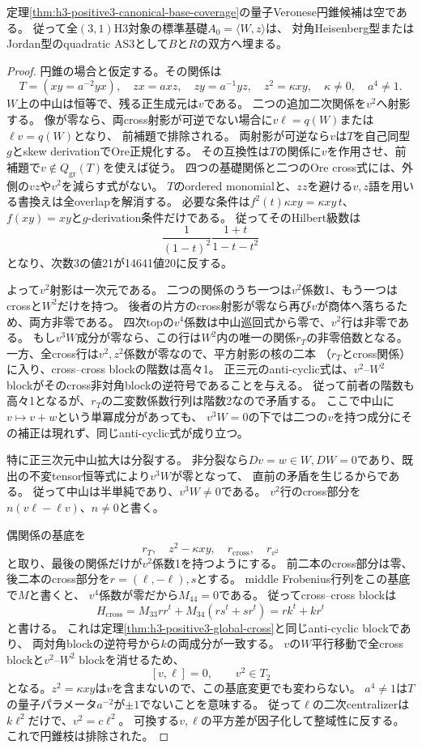 \begin{theorem}\label{thm:h3-positive3-cone-base-exclusion}
定理\ref{thm:h3-positive3-canonical-base-coverage}の量子Veronese円錐候補は空である。
従って全$(3,1)$H3対象の標準基礎$A_0=\langle W,z\rangle$は、
対角Heisenberg型またはJordan型のquadratic AS3として$B$と$R$の双方へ埋まる。
\end{theorem}
\begin{proof}
円錐の場合と仮定する。その関係は
\[
 T=(xy=a^{-2}yx),\quad zx=axz,\quad zy=a^{-1}yz,
 \quad z^2=\kappa xy,\quad\kappa\ne0,\quad a^4\ne1.
\]
$W$上の中山は恒等で、残る正生成元は$v$である。
二つの追加二次関係を$v^2$へ射影する。
像が零なら、両cross射影が可逆でない場合に$v\ell=q(W)$または$\ell v=q(W)$となり、
前補題で排除される。
両射影が可逆なら$v$は$T$を自己同型$g$とskew derivationでOre正規化する。
その互換性は$T$の関係に$v$を作用させ、前補題で$v\notin Q_{\mathrm{gr}}(T)$を使えば従う。
四つの基礎関係と二つのOre cross式には、外側の$vz$や$v^2$を減らす式がない。
$T$のordered monomialと、$zz$を避ける$v,z$語を用いる書換えは全overlapを解消する。
必要な条件は$f^2(t)\kappa xy=\kappa xy\,t$、$f(xy)=xy$と$g$-derivation条件だけである。
従ってそのHilbert級数は
\[
 \frac1{(1-t)^2}\frac{1+t}{1-t-t^2}
\]
となり、次数3の値21が14641値20に反する。

よって$v^2$射影は一次元である。
二つの関係のうち一つは$v^2$係数1、もう一つはcrossと$W^2$だけを持つ。
後者の片方のcross射影が零なら再び$v$が商体へ落ちるため、両方非零である。
四次topの$v^4$係数は中山巡回式から零で、$v^2$行は非零である。
もし$v^3W$成分が零なら、この行は$W^2$内の唯一の関係$r_T$の非零倍数となる。
一方、全cross行は$v^2,z^2$係数が零なので、平方射影の核の二本
（$r_T$とcross関係）に入り、cross--cross blockの階数は高々1。
正三元のanti-cyclic式は、$v^2$--$W^2$ blockがそのcross非対角blockの逆符号であることを与える。
従って前者の階数も高々1となるが、$r_T$の二変数係数行列は階数2なので矛盾する。
ここで中山に$v\mapsto v+w$という単冪成分があっても、
$v^3W=0$の下では二つの$v$を持つ成分にその補正は現れず、同じanti-cyclic式が成り立つ。

特に正三次元中山拡大は分裂する。
非分裂なら$Dv=w\in W,DW=0$であり、既出の不変tensor恒等式により$v^3W$が零となって、
直前の矛盾を生じるからである。
従って中山は半単純であり、$v^3W\ne0$である。
$v^2$行のcross部分を$n(v\ell-\ell v)$、$n\ne0$と書く。

偶関係の基底を
\[
 r_T,\quad z^2-\kappa xy,\quad
 r_{\mathrm{cross}},\quad r_{v^2}
\]
と取り、最後の関係だけが$v^2$係数1を持つようにする。
前二本のcross部分は零、後二本のcross部分を$r=(\ell,-\ell),s$とする。
middle Frobenius行列をこの基底で$M$と書くと、
$v^4$係数が零だから$M_{44}=0$である。
従ってcross--cross blockは
\[
 H_{\mathrm{cross}}=M_{33}rr^t+M_{34}(rs^t+sr^t)=rk^t+kr^t
\]
と書ける。
これは定理\ref{thm:h3-positive3-global-cross}と同じanti-cyclic blockであり、
両対角blockの逆符号から$k$の両成分が一致する。
$v$の$W$平行移動で全cross blockと$v^2$--$W^2$ blockを消せるため、
\[
 [v,\ell]=0,\qquad v^2\in T_2
\]
となる。$z^2=\kappa xy$は$v$を含まないので、この基底変更でも変わらない。
$a^4\ne1$は$T$の量子パラメータ$a^{-2}$が$\pm1$でないことを意味する。
従って$\ell$の二次centralizerは$k\ell^2$だけで、$v^2=c\ell^2$。
可換する$v,\ell$の平方差が因子化して整域性に反する。
これで円錐枝は排除された。
\end{proof}


